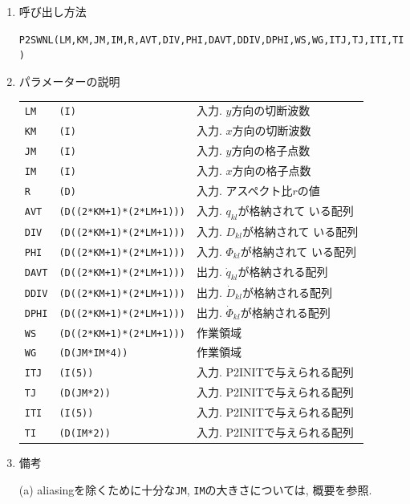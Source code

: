 \documentclass[a4j,fleqn]{jarticle}
\begin{document}
\begin{enumerate}
\item 呼び出し方法 

{\tt P2SWNL(LM,KM,JM,IM,R,AVT,DIV,PHI,DAVT,DDIV,DPHI,WS,WG,ITJ,TJ,ITI,TI)}
  
\item パラメーターの説明

\begin{tabular}{lll}
{\tt LM} & {\tt (I)} & 入力. $y$方向の切断波数\\
{\tt KM} & {\tt (I)} & 入力. $x$方向の切断波数\\
{\tt JM} & {\tt (I)} & 入力. $y$方向の格子点数\\
{\tt IM} & {\tt (I)} & 入力. $x$方向の格子点数\\
{\tt R} & {\tt (D)} & 入力. アスペクト比$r$の値\\
{\tt AVT} & {\tt (D((2*KM+1)*(2*LM+1)))} & 入力. $q_{kl}$が格納されて
いる配列\\
{\tt DIV} & {\tt (D((2*KM+1)*(2*LM+1)))} & 入力. $D_{kl}$が格納されて
いる配列\\
{\tt PHI} & {\tt (D((2*KM+1)*(2*LM+1)))} & 入力. $\Phi_{kl}$が格納されて
いる配列\\
{\tt DAVT} & {\tt (D((2*KM+1)*(2*LM+1)))} & 出力. 
$\dot q_{kl}$が格納される配列\\
{\tt DDIV} & {\tt (D((2*KM+1)*(2*LM+1)))} & 出力.
$\dot D_{kl}$が格納される配列\\
{\tt DPHI} & {\tt (D((2*KM+1)*(2*LM+1)))} & 出力.
$\dot \Phi_{kl}$が格納される配列\\
{\tt WS} & {\tt (D((2*KM+1)*(2*LM+1)))} & 作業領域\\
{\tt WG} & {\tt (D(JM*IM*4))} & 作業領域\\
{\tt ITJ} & {\tt (I(5))} & 入力. P2INITで与えられる配列\\
{\tt TJ} & {\tt (D(JM*2))} & 入力. P2INITで与えられる配列\\
{\tt ITI} & {\tt (I(5))} & 入力. P2INITで与えられる配列\\
{\tt TI} & {\tt (D(IM*2))} & 入力. P2INITで与えられる配列
\end{tabular}

\item 備考

(a) aliasingを除くために十分な{\tt JM}, {\tt IM}の大きさについては, 
概要を参照.

\end{enumerate}

\end{document}
